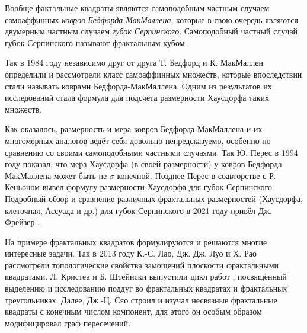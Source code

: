 Вообще фактальные квадраты являются самоподобным частным случаем самоаффинных {\em ковров Бедфорда-МакМаллена}, которые в свою очередь являются двумерным частным случаем {\em губок Серпинского}.
Самоподобный частный случай губок Серпинского называют фрактальным кубом.




Так в 1984 году независимо друг от друга Т. Бедфорд \cite{Bedford1984} и К. МакМаллен \cite{McMullen1984} определили и рассмотрели класс самоаффинных множеств, которые впоследствии стали называть коврами Бедфорда-МакМаллена.
Одним из результатов их исследований стала формула для подсчёта размерности Хаусдорфа таких множеств.

Как оказалось, размерность и мера ковров Бедфорда-МакМаллена и их многомерных аналогов ведёт себя довольно непредсказуемо, особенно по сравнению со своими самоподобными частными случаями.
Так Ю. Перес \cite{Peres1994} в 1994 году показал, что мера Хаусдорфа (в своей размерности) у ковров Бедфорда-МакМаллена может быть не $\sigma$-конечной.
Позднее Перес в соавторстве с Р. Кеньоном \cite{KenyonPeres1996} вывел формулу размерности Хаусдорфа для губок Серпинского.
Подробный обзор и сравнение различных фрактальных размерностей (Хаусдорфа, клеточная, Ассуада и др.) для губок Серпинского в 2021 году привёл Дж. Фрейзер \cite{Fraser_2021}.

На примере фрактальных квадратов формулируются и решаются многие интересные задачи. 
Так в 2013 году К.-С. Лао, Дж. Дж. Луо и Х. Рао \cite{LLR2013} рассмотрели топологические свойства замощений плоскости фрактальными квадратами.
Л. Кристеа и Б. Штейнски выпустили цикл работ \cite{CS1,CS2,CS3}, посвящённый выделению и исследованию поддуг во фрактальных квадратах и фрактальных треугольниках.
Далее, Дж.-Ц. Сяо \cite{Xiao2021} строил и изучал несвязные фрактальные квадраты с конечным числом компонент, для этого он особым образом модифицировал граф пересечений.


